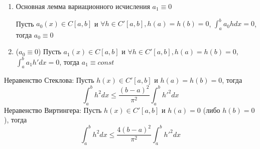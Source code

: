 \documentclass{article}
\begin{document}
\begin{corollary}
  \phantom{.}

  \begin{enumerate}
    \item Основная лемма вариационного исчисления $a_1 \equiv 0$
      
      Пусть $a_0(x) \in C[a,b]$ и $\forall h \in C'[a,b], h(a)=h(b)=0$,
      $\int_{a}^{b}a_0hdx=0$, тогда $a_0 \equiv 0$
    \item ($a_0 \equiv 0$) Пусть $a_1(x) \in C[a,b]$ и $\forall h \in C'[a,b], h(a)=h(b)=0$,
      $\int_{a}^{b}a_1 h'dx=0$, тогда $a_1 \equiv const$
  \end{enumerate}
\end{corollary}
\begin{remark}
  Неравенство Стеклова: Пусть $h(x) \in C'[a,b]$ и $h(a)=h(b)=0$, тогда
  \[
    \int_{a}^{b}h^{2}dx \le \frac{(b-a)^{2}}{\pi^{2}}\int_{a}^{b}h'^{2}dx
  \]
  Неравенство Виртингера: Пусть $h(x) \in C'[a,b]$ и $h(a)=0$ (либо $h(b)=0$), тогда
  \[
    \int_{a}^{b}h^{2}dx \le \frac{4(b-a)^{2}}{\pi^{2}}\int_{a}^{b}h'^{2}dx
  \]
\end{remark}
\end{document}
